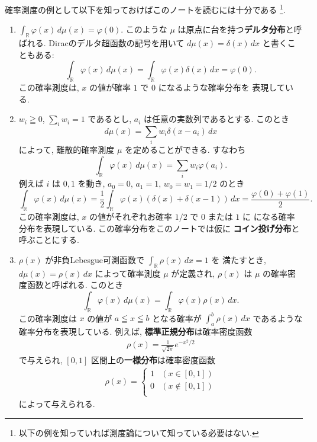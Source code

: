 \documentclass[12pt,twoside]{jarticle}
\newcommand\BF{\bfseries}
\newcommand\R{{\mathbb R}} %
\theoremstyle{jplain}
\theoremstyle{jplain}
\theoremstyle{jplain}
\numberwithin{theorem}{section}
\numberwithin{equation}{section}
\numberwithin{figure}{section}
\numberwithin{table}{section}
\begin{document}
確率測度の例として以下を知っておけばこのノートを読むには十分である%
\footnote{以下の例を知っていれば測度論について知っている必要はない.}.
\begin{enumerate}
  \item $\int_\R \varphi(x)\,d\mu(x) = \varphi(0)$.
  このような $\mu$ は原点に台を持つ{\BF デルタ分布}と呼ばれる.
  Diracのデルタ超函数の記号を用いて $d\mu(x)=\delta(x)\,dx$ と書くこともある:
  \begin{equation*}
    \int_\R \varphi(x)\,d\mu(x)
    = \int_\R \varphi(x)\delta(x)\,dx
    = \varphi(0).
  \end{equation*}
  この確率測度は, $x$ の値が確率 $1$ で $0$ になるような確率分布を
  表現している.

  \item $w_i\geqq 0$, $\sum_i w_i=1$ であるとし,
  $a_i$ は任意の実数列であるとする. このとき
  \begin{equation*}
    d\mu(x)=\sum_i w_i\delta(x-a_i)\,dx
  \end{equation*}
  によって, 離散的確率測度 $\mu$ を定めることができる. すなわち
  \begin{equation*}
    \int_\R \varphi(x)\,d\mu(x)=\sum_i w_i\varphi(a_i).
  \end{equation*}
  例えば $i$ は $0,1$ を動き, $a_0=0$, $a_1=1$, $w_0=w_1=1/2$ のとき
  \begin{equation*}
    \int_\R \varphi(x)\,d\mu(x)
    =\frac12\int_\R \varphi(x)(\delta(x)+\delta(x-1))\,dx
    = \frac{\varphi(0)+\varphi(1)}2.
  \end{equation*}
  この確率測度は, $x$ の値がそれぞれお確率 $1/2$ で $0$ または $1$ に
  になる確率分布を表現している. この確率分布をこのノートでは仮に
  {\BF コイン投げ分布}と呼ぶことにする.

  \item $\rho(x)$ が非負Lebesgue可測函数で $\int_\R \rho(x)\,dx=1$ を
  満たすとき, $d\mu(x) = \rho(x)\,dx$ によって確率測度 $\mu$ が定義され,
  $\rho(x)$ は $\mu$ の確率密度函数と呼ばれる. このとき
  \begin{equation*}
    \int_\R \varphi(x)\,d\mu(x)=\int_\R\varphi(x)\rho(x)\,dx.
  \end{equation*}
  この確率測度は $x$ の値が $a\leqq x\leqq b$ となる確率が
  $\int_a^b\rho(x)\,dx$ であるような確率分布を表現している.
  例えば, {\BF 標準正規分布}は確率密度函数
  \begin{align*}
    \rho(x) = \frac1{\sqrt{2\pi}}e^{-x^2/2}
  \end{align*}
  で与えられ, $[0,1]$ 区間上の{\BF 一様分布}は確率密度函数
  \begin{align*}
    \rho(x) = \begin{cases}
      1 & (x\in[0,1]) \\
      0 & (x\not\in[0,1])\\
    \end{cases}
  \end{align*}
  によって与えられる.
\end{enumerate}
\end{document}
